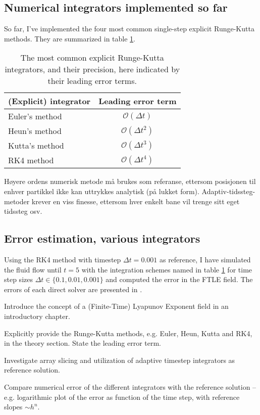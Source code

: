 \subsection{Numerical integrators implemented so far}
\label{sec:initial_numerical_integrators}
So far, I've implemented the four most common single-step explicit
Runge-Kutta methods. They are summarized in table 
\ref{tab:initial_explicit_integrators}. 

\begin{table}[h]
  \centering
  \caption{The most common explicit Runge-Kutta integrators, and their
           precision, here indicated by their leading error terms.}
  \label{tab:initial_explicit_integrators}
  \begin{tabular}[h]{l|c}
    \hline
    (Explicit) integrator & Leading error term \\
    \hline
    Euler's method & $\mathcal{O}(\Delta{}t)$ \\
    Heun's method & $\mathcal{O}(\Delta{}t^{2})$ \\
    Kutta's method & $\mathcal{O}(\Delta{}t^{3})$ \\
    RK4 method & $\mathcal{O}(\Delta{}t^{4})$ \\
    \hline
  \end{tabular}
\end{table}



Høyere ordens numerisk metode må brukes som referanse, ettersom
posisjonen til enhver partikkel ikke kan uttrykkes analytisk (på lukket
form). Adaptiv-tidssteg-metoder krever en viss finesse, ettersom hver
enkelt bane vil trenge sitt eget tidssteg osv.




\subsection{Error estimation, various integrators}

Using the RK4 method with timestep $\Delta{}t=0.001$ as reference, I
have simulated the fluid flow until $t=5$ with the integration schemes
named in table \ref{tab:initial_explicit_integrators} for time step
sizes $\Delta{}t\in\{0.1,0.01,0.001\}$ and computed the error in the
FTLE field. The errors of each direct solver are presented in
. 

\begin{tcolorbox}
  Introduce the concept of a (Finite-Time) Lyapunov Exponent field
  in an introductory chapter.

  Explicitly provide the Runge-Kutta methods, e.g. Euler, Heun, Kutta
  and RK4, in the theory section. State the leading error term.

  Investigate array slicing and utilization of adaptive timestep
  integrators as reference solution.

  Compare numerical error of the different integrators with the
  reference solution -- e.g. logarithmic plot of the error as function
  of the time step, with reference slopes $\sim{}h^{n}$.
\end{tcolorbox}

